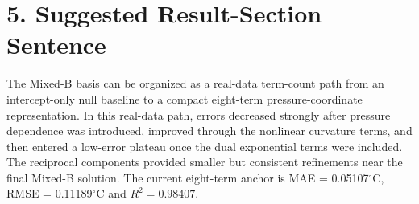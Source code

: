 \documentclass[10pt]{article}
\begin{document}
\section*{5. Suggested Result-Section Sentence}

\noindent
The Mixed-B basis can be organized as a real-data term-count path from an intercept-only null baseline to a compact eight-term pressure-coordinate representation.
In this real-data path, errors decreased strongly after pressure dependence was introduced, improved through the nonlinear curvature terms, and then entered a low-error plateau once the dual exponential terms were included.
The reciprocal components provided smaller but consistent refinements near the final Mixed-B solution.
The current eight-term anchor is MAE = 0.05107$^\circ$C, RMSE = 0.11189$^\circ$C and $R^2=0.98407$.
\end{document}
